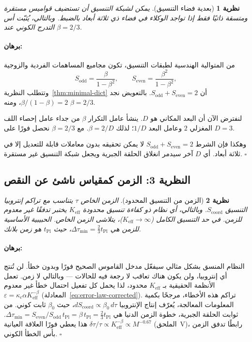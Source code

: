 \documentclass[11pt,a4paper]{article}
\newtheorem{theorem}{نظرية}
\renewenvironment{proof}{\paragraph{برهان:}}{\hfill$\square$}
\newcommand{\tPl}{t_{\mathrm{Pl}}}
\newcommand{\Scoord}{S_{\mathrm{coord}}}
\begin{document}
	\begin{theorem}[بعدية فضاء التنسيق]
		\label{thm:dimension}
		يمكن لشبكة التنسيق أن تستضيف قواميس مستقرة ومتسقة ذاتيًا فقط إذا تواجد الوكلاء في فضاء ذي ثلاثة أبعاد بالضبط. وبالتالي، يُثبّت أس التدرج الكوني عند \(\beta = 2/3\).
	\end{theorem}
	
	\begin{proof}
		من المتوالية الهندسية لطبقات التنسيق، تكون مجاميع المساهمات الفردية والزوجية
		\[
		S_{\mathrm{odd}} = \frac{\beta}{1-\beta^2}, \qquad
		S_{\mathrm{even}} = \frac{\beta^2}{1-\beta^2},
		\]
		وتتطلب النظرية~\ref{thm:minimal-dict} أن \(S_{\mathrm{odd}} + S_{\mathrm{even}} = 2\). بالتعويض نجد \(\beta/(1-\beta) = 2\)، ومنه \(\beta = 2/3\).
		
		لنفترض الآن أن البعد المكاني هو \(D\). ينشأ عامل التكرار \(\beta\) من جداء عامل إحصاء اللف المغزلي \(2\) وعامل البعد \(1/D\)؛ لذلك \(\beta = 2/D\). مع \(\beta = 2/3\) نحصل فورًا على \(D = 3\).
		
		وهكذا فإن الشرط \(S_{\mathrm{odd}} + S_{\mathrm{even}} = 2\) لا يمكن تحقيقه بدون معاملات قابلة للتعديل إلا في ثلاثة أبعاد. أي \(D\) آخر سيدمر انغلاق الحلقة الجبرية ويجعل شبكة التنسيق غير مستقرة.
	\end{proof}
	
	\subsection{النظرية 3: الزمن كمقياس ناشئ عن النقص}
	
	\begin{theorem}[الزمن من التنسيق المحدود]
		\label{thm:time}
		الزمن الخاص \(\tau\) يتناسب مع تراكم إنتروبيا التنسيق \(\Scoord\). وبالتالي، أي نظام ذو كفاءة تنسيق محدودة \(K_{\mathrm{eff}}\) يختبر تدفقًا غير معدوم للزمن. في حد التنسيق الكامل (\(K_{\mathrm{eff}} \to \infty\))، يتلاشى الزمن الخاص. الحبيبية الأساسية للزمن هي \(\Delta \tau_{\min} = \frac{2}{3} \tPl\)، حيث \(\tPl\) هو زمن بلانك.
	\end{theorem}
	
	\begin{proof}
		النظام المنسق بشكل مثالي سيفعّل مدخل القاموس الصحيح فورًا وبدون خطأ. لن تُنتج أي إنتروبيا، ولن يكون هناك تعاقب لا رجعة فيه للحالات — وبالتالي لا زمن. تعمل الأنظمة الحقيقية بـ \(K_{\mathrm{eff}}\) محدود، لذا يحمل كل تفعيل احتمال خطأ غير معدوم \(\varepsilon = \kappa_c \alpha K_{\mathrm{eff}}^{-\beta}\) (المعادلة~\ref{eq:error-law-corrected}). تراكم هذه الأخطاء، مرجحًا بكمية المعلومات المعالجة، يُعرّف إنتاج الإنتروبيا \(d\Scoord \propto \beta_0 \, d\tau\)، حيث \(\beta_0\) ثابت كوني. من ثوابت الحلقة الجبرية، خطوة الزمن الدنيا هي \(\Delta \tau_{\min} = S_{\mathrm{even}}/S_{\mathrm{odd}} \, \tPl = \beta \, \tPl = \frac{2}{3} \tPl\). هذا يعطي فورًا العلاقة العيانية \(\delta\tau/\tau \propto K_{\mathrm{eff}}^{-\beta} \propto M^{-0.67}\) (الملحق~V)، رابطًا تدفق الزمن بأس الخطأ الكوني.
	\end{proof}
	
\end{document}
